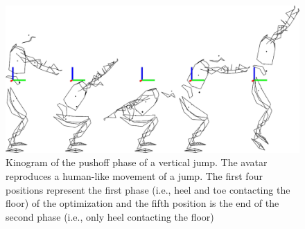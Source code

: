\begin{figure}[h!]
\includegraphics[width=\columnwidth]{figures/kinogramme_jump}
\caption{Kinogram of the pushoff phase of a vertical jump. The avatar reproduces a human-like movement of a jump. The first four positions represent the first phase (i.e., heel and toe contacting the floor) of the optimization and the fifth position is the end of the second phase (i.e., only heel contacting the floor)} 
\label{fig:graph_force_vitesse_longueur}
\end{figure}
